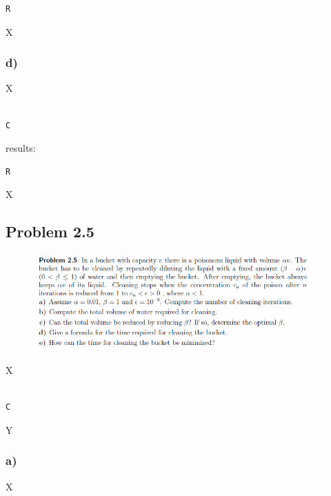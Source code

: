 \begin{lstlisting}[caption=Result of 1.1 a), keywordstyle=\color{black}]
R
\end{lstlisting}

X



\subsubsection{d)}

X

\begin{lstlisting}[caption=todo]

C

\end{lstlisting}


results:

\begin{lstlisting}[caption=Result of 1.1 a), keywordstyle=\color{black}]
R
\end{lstlisting}

X


\subsection{Problem 2.5}


\begin{figure}[!ht]
\includegraphics[width=1\textwidth]{chapters/images/desc-2-5}
\end{figure}


X

\begin{lstlisting}[caption=todo]

C

\end{lstlisting}

Y


\subsubsection{a)}

X

